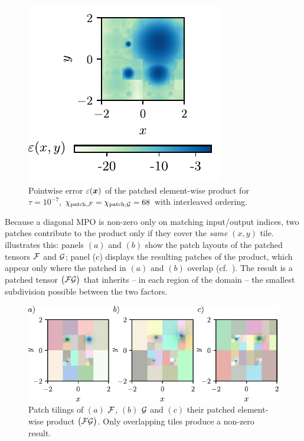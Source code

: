 \begin{figure}[htpb]
    \centering
    \includegraphics{figures/elemMulError.pdf}
    \caption{Pointwise error \(\varepsilon(\boldsymbol{x})\) of the patched element-wise product for \(\tau=10^{-7}\), $\chi_{\text{patch},\mathcal{F}} = \chi_{\text{patch},\mathcal{G}} = 68$ with interleaved ordering.}
    \label{fig:localErrorElemmul}
\end{figure}



Because a diagonal MPO is non-zero only on matching input/output indices, two patches contribute to the product only if they cover the \emph{same} \((x,y)\) tile.  
 illustrates this: panels $(a)$ and $(b)$ show the patch layouts of the patched tensors \(\mathcal{F}\) and
\(\mathcal{G}\); panel (c) displays the resulting patches of the product, which appear only where the patched in $(a)$ and $(b)$ overlap (cf.\
). The result is a patched tensor \(\bigl(\mathcal{F}\mathcal{G}\bigr)\) that inherits -- in each region of the domain -- the smallest subdivision possible between the two factors.
\begin{figure}[htbp]
    \centering
    \includegraphics{figures/ElemmulResults.pdf}
    \caption{Patch tilings of $(a)$ \(\mathcal{F}\), $(b)$ \(\mathcal{G}\) and $(c)$ their patched element-wise product \(\bigl(\mathcal{F}\mathcal{G}\bigr)\). Only overlapping tiles produce a non-zero result.}
    \label{fig:patchingPatternsElemMul}
\end{figure}

